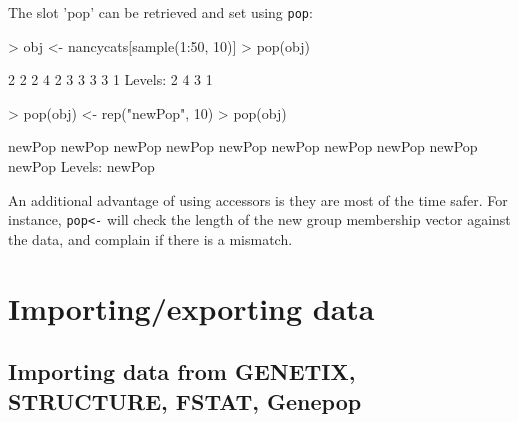 \documentclass{article}
\begin{document}
\noindent The slot 'pop' can be retrieved and set using \texttt{pop}:
\begin{Schunk}
\begin{Sinput}
> obj <- nancycats[sample(1:50, 10)]
> pop(obj)
\end{Sinput}
\begin{Soutput}
 [1] 2 2 2 4 2 3 3 3 3 1
Levels: 2 4 3 1
\end{Soutput}
\begin{Sinput}
> pop(obj) <- rep("newPop", 10)
> pop(obj)
\end{Sinput}
\begin{Soutput}
 [1] newPop newPop newPop newPop newPop newPop newPop newPop newPop newPop
Levels: newPop
\end{Soutput}
\end{Schunk}
An additional advantage of using accessors is they are most of the time safer. For instance,
\texttt{pop<-} will check the length of the new group membership vector against the data, and
complain if there is a mismatch.






\newpage
\section{Importing/exporting data}


\subsection{Importing data from GENETIX, STRUCTURE, FSTAT, Genepop}
\end{document}
